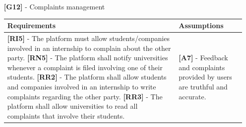 \documentclass[11pt,twoside]{article}
\begin{document}
\begin{itemize}
\newpage
\item[\textbf{[G12]}] - Complaints management
\begin{table}[H]
\begin{tabular}{| p{} | p{} |}
\hline
\textbf{Requirements} & \textbf{Assumptions} \\
\hline
\textbf{[RI5]} - The platform must allow students/companies involved in an internship to complain about the other party. \newline
\textbf{[RN5]} - The platform shall notify universities whenever a complaint is filed involving one of their students. \newline
\textbf{[RR2]} - The platform shall allow students and companies involved in an internship to write complaints regarding the other party. \newline
\textbf{[RR3]} - The platform shall allow universities to read all complaints that involve their students.
& \textbf{[A7]} - Feedback and complaints provided by users are truthful and accurate. \\
\hline
\end{tabular}
\end{table}
\end{itemize}
\end{document}
